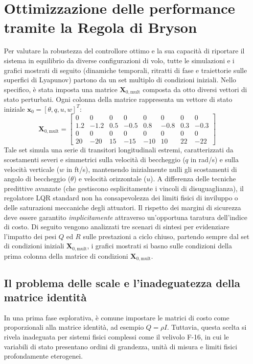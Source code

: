 \section{Ottimizzazione delle performance tramite la Regola di Bryson}
Per valutare la robustezza del controllore ottimo e la sua capacità di riportare il sistema in equilibrio da diverse configurazioni di volo, tutte le simulazioni e i grafici mostrati di seguito (dinamiche temporali, ritratti di fase e traiettorie sulle superfici di Lyapunov) partono da un set multiplo di condizioni iniziali. Nello specifico, è stata imposta una matrice $\mathbf{X}_{0,\text{mult}}$ composta da otto diversi vettori di stato perturbati. Ogni colonna della matrice rappresenta un vettore di stato iniziale $\mathbf{x}_0 = [\theta, q, u, w]^T$:
\begin{equation}
	\mathbf{X}_{0,\text{mult}} = \begin{bmatrix}
		0 & 0 & 0 & 0 & 0 & 0 & 0 & 0 \\
		1.2 & -1.2 & 0.5 & -0.5 & 0.8 & -0.8 & 0.3 & -0.3 \\
		0 & 0 & 0 & 0 & 0 & 0 & 0 & 0 \\
		20 & -20 & 15 & -15 & -10 & 10 & 22 & -22
	\end{bmatrix}
\end{equation}
Tale set simula una serie di transitori longitudinali estremi, caratterizzati da scostamenti severi e simmetrici sulla velocità di beccheggio ($q$ in rad/s) e sulla velocità verticale ($w$ in ft/s), mantenendo inizialmente nulli gli scostamenti di angolo di beccheggio ($\theta$) e velocità orizzontale ($u$). A differenza delle tecniche predittive avanzate (che gestiscono esplicitamente i vincoli di disuguaglianza), il regolatore LQR standard non ha consapevolezza dei limiti fisici di inviluppo o delle saturazioni meccaniche degli attuatori. Il rispetto dei margini di sicurezza deve essere garantito \textit{implicitamente} attraverso un'opportuna taratura dell'indice di costo. Di seguito vengono analizzati tre scenari di sintesi per evidenziare l'impatto dei pesi $Q$ ed $R$ sulle prestazioni a ciclo chiuso, partendo sempre dal set di condizioni iniziali $\mathbf{X}_{0,\text{mult}}$, i grafici mostrati si basno sulle condizioni della prima colonna della matrice di condizioni $\mathbf{X}_{0,\text{mult}}$.

\subsection{Il problema delle scale e l'inadeguatezza della matrice identità}
In una prima fase esplorativa, è comune impostare le matrici di costo come proporzionali alla matrice identità, ad esempio $Q = \rho I$. Tuttavia, questa scelta si rivela inadeguata per sistemi fisici complessi come il velivolo F-16, in cui le variabili di stato presentano ordini di grandezza, unità di misura e limiti fisici profondamente eterogenei.

